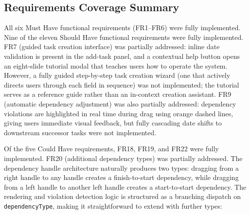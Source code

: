 \documentclass[12pt,nonacm,acmlarge,titlepage,screen]{acmart}
\begin{document}




\subsection{Requirements Coverage Summary} \label{sec:impl_coverage}

All six Must Have functional requirements (FR1--FR6) were fully implemented. Nine of the
eleven Should Have functional requirements were fully implemented. FR7 (guided task creation
interface) was partially addressed: inline date validation is present in the add-task panel,
and a contextual help button opens an eight-slide tutorial modal that teaches users how to
operate the system. However, a fully guided step-by-step task creation wizard  (one that
actively directs users through each field in sequence) was not implemented; the tutorial
serves as a reference guide rather than an in-context creation assistant. FR9 (automatic
dependency adjustment) was also partially addressed: dependency violations are highlighted in
real time during drag using orange dashed lines, giving users immediate visual feedback, but
fully cascading date shifts to downstream successor tasks were not implemented.

Of the five Could Have requirements, FR18, FR19, and FR22 were fully implemented. FR20
(additional dependency types) was partially addressed. The dependency handle architecture
naturally produces two types: dragging from a right handle to any handle creates a
finish-to-start dependency, while dragging from a left handle to another left handle creates
a start-to-start dependency. The rendering and violation detection logic is structured as a
branching dispatch on \texttt{dependencyType}, making it straightforward to extend with
further types:
\end{document}
